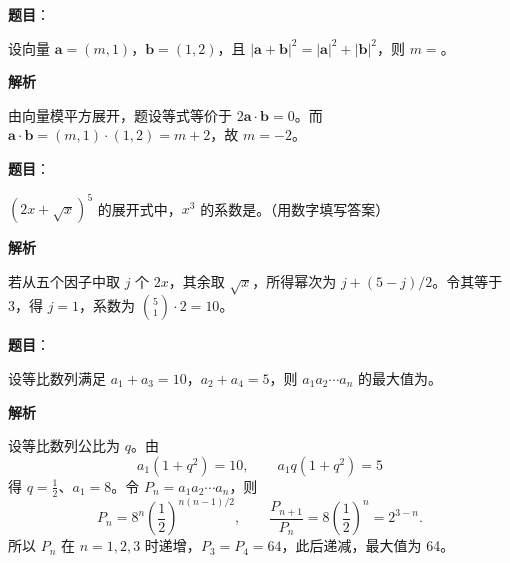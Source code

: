 \begin{answer}

\textbf{题目}：

设向量 $\boldsymbol a=(m,1)$，$\boldsymbol b=(1,2)$，且 $|\boldsymbol a+\boldsymbol b|^2=|\boldsymbol a|^2+|\boldsymbol b|^2$，则 $m=$\gkblank{}。

\textbf{解析}

由向量模平方展开，题设等式等价于 \(2\boldsymbol a\cdot\boldsymbol b=0\)。而 \(\boldsymbol a\cdot\boldsymbol b=(m,1)\cdot(1,2)=m+2\)，故 \(m=-2\)。


\end{answer}
\begin{answer}

\textbf{题目}：

$(2x+\sqrt{x})^5$ 的展开式中，$x^3$ 的系数是\gkblank{}。（用数字填写答案）

\textbf{解析}

若从五个因子中取 \(j\) 个 \(2x\)，其余取 \(\sqrt{x}\)，所得幂次为 \(j+(5-j)/2\)。令其等于 3，得 \(j=1\)，系数为 \(\binom51\cdot2=10\)。


\end{answer}
\begin{answer}

\textbf{题目}：

设等比数列满足 $a_1+a_3=10$，$a_2+a_4=5$，则 $a_1a_2\cdots a_n$ 的最大值为\gkblank{}。

\textbf{解析}

设等比数列公比为 \(q\)。由
\nopagebreak[4]
\[
a_1(1+q^2)=10,\qquad a_1q(1+q^2)=5
\]
得 \(q=\frac12\)、\(a_1=8\)。令 \(P_n=a_1a_2\cdots a_n\)，则
\nopagebreak[4]
\[
P_n=8^n\left(\frac12\right)^{n(n-1)/2},\qquad
\frac{P_{n+1}}{P_n}=8\left(\frac12\right)^n=2^{3-n}.
\]
所以 \(P_n\) 在 \(n=1,2,3\) 时递增，\(P_3=P_4=64\)，此后递减，最大值为 64。


\end{answer}
